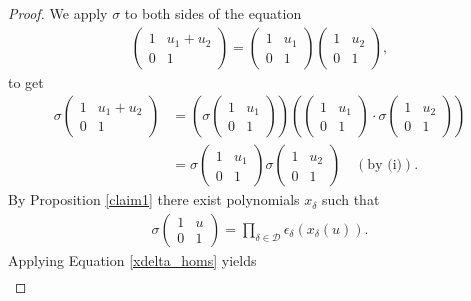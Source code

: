 \begin{proof}
We apply $\sigma$ to both sides of the equation
\begin{align*}
	\left(\begin{matrix} 1 & u_1 + u_2 \\ 0 & 1 \end{matrix}\right) = 
	\left(\begin{matrix} 1 & u_1 \\ 0 & 1 \end{matrix}\right)
	\left(\begin{matrix} 1 & u_2 \\ 0 & 1 \end{matrix}\right),
\end{align*}
to get 
\begin{align}
\sigma\left(\begin{matrix} 1 & u_1 + u_2 \\ 0 & 1 \end{matrix}\right) &=
	\left(\sigma\left(\begin{matrix} 1 & u_1 \\ 0 & 1 \end{matrix}\right)\right)
	\left(\left(\begin{matrix} 1 & u_1 \\ 0 & 1 \end{matrix}\right)\cdot\sigma\left(\begin{matrix} 1 & u_2 \\ 0 & 1 \end{matrix}\right)\right)\nonumber \\ &=
	\sigma\left(\begin{matrix} 1 & u_1 \\ 0 & 1 \end{matrix}\right)
	\sigma\left(\begin{matrix} 1 & u_2 \\ 0 & 1 \end{matrix}\right)\quad(\textrm{by (i)}) \label{xdelta_homs}.
\end{align}
By Proposition \ref{claim1} there exist polynomials $x_\delta$ such that
\begin{align*}
	\sigma\left(\begin{matrix}1 & u\\0 & 1\end{matrix}\right) = \prod_{\delta\in\mathcal{D}} \epsilon_\delta\left(x_\delta(u)\right).
\end{align*}
Applying Equation \ref{xdelta_homs} yields
\begin{align*}

\end{align*}
\end{proof}
